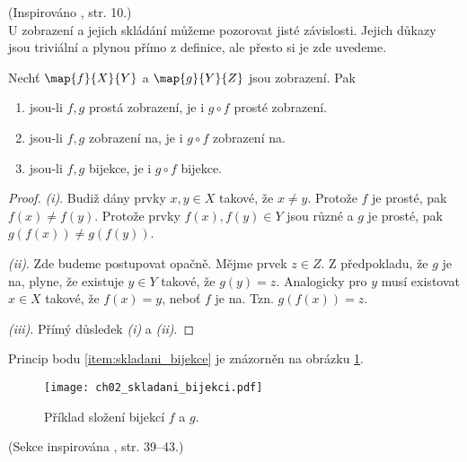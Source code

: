 (Inspirováno \cite{Becvar2019}, str. 10.)\\
U zobrazení a jejich skládání můžeme pozorovat jisté závislosti. Jejich důkazy jsou triviální a plynou přímo z definice, ale přesto si je zde uvedeme.
\begin{lemma}
    Nechť $\map{f}{X}{Y}$ a $\map{g}{Y}{Z}$ jsou zobrazení. Pak
    \begin{enumerate}[label=(\roman*)]
        \item\label{item:skladani_injekce} jsou-li $f,g$ prostá zobrazení, je i $g\circ f$ prosté zobrazení.
        \item\label{item:skladani_surjekce} jsou-li $f,g$ zobrazení na, je i $g\circ f$ zobrazení na.
        \item\label{item:skladani_bijekce} jsou-li $f,g$ bijekce, je i $g\circ f$ bijekce.
    \end{enumerate}
\end{lemma}
\begin{proof}
    \textit{(i)}. Budiž dány prvky $x,y\in X$ takové, že $x\neq y$. Protože $f$ je prosté, pak $f(x)\neq f(y)$. Protože prvky $f(x),f(y)\in Y$ jsou různé a $g$ je prosté, pak $g(f(x))\neq g(f(y))$.\par
    \textit{(ii)}. Zde budeme postupovat opačně. Mějme prvek $z\in Z$. Z předpokladu, že $g$ je na, plyne, že existuje $y\in Y$ takové, že $g(y)=z$. Analogicky pro $y$ musí existovat $x\in X$ takové, že $f(x)=y$, neboť $f$ je na. Tzn. $g(f(x))=z$.\par
    \textit{(iii)}. Přímý důsledek \textit{(i)} a \textit{(ii)}.
\end{proof}
Princip bodu \ref{item:skladani_bijekce} je znázorněn na obrázku \ref{fig:skladani_bijekci}.
\begin{figure}[H]
    \centering
    \texttt{[image: ch02\_skladani\_bijekci.pdf]}
    \caption{Příklad složení bijekcí $f$ a $g$.}
    \label{fig:skladani_bijekci}
\end{figure}

(Sekce inspirována \cite{MatousekNesetril2009}, str. 39--43.)

